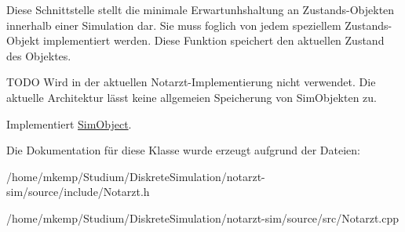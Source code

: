 Diese Schnittstelle stellt die minimale Erwartunhshaltung an Zustands-\/\+Objekten innerhalb einer Simulation dar. Sie muss foglich von jedem speziellem Zustands-\/\+Objekt implementiert werden. Diese Funktion speichert den aktuellen Zustand des Objektes.

T\+O\+DO Wird in der aktuellen Notarzt-\/\+Implementierung nicht verwendet. Die aktuelle Architektur lässt keine allgemeien Speicherung von Sim\+Objekten zu. 

Implementiert \hyperlink{classSimObject_a3100e6db6c86456b79351c7e6a62ec65}{Sim\+Object}.



Die Dokumentation für diese Klasse wurde erzeugt aufgrund der Dateien\+:\begin{DoxyCompactItemize}
\item 
/home/mkemp/\+Studium/\+Diskrete\+Simulation/notarzt-\/sim/source/include/Notarzt.\+h\item 
/home/mkemp/\+Studium/\+Diskrete\+Simulation/notarzt-\/sim/source/src/Notarzt.\+cpp\end{DoxyCompactItemize}

